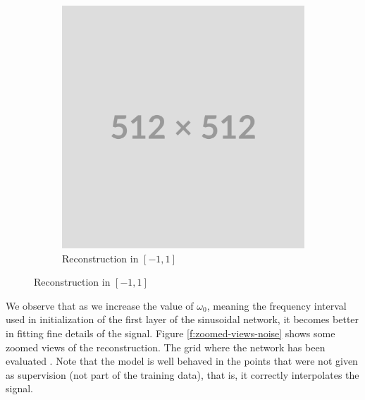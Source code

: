 \begin{figure}
    \begin{subfigure}[b]{0.6\textwidth}
        \centering
        \includegraphics[width=\textwidth]{img/placeholder512.png}
        \caption{Reconstruction in $[-1, 1]$}
        \label{fig:fft-smooth-noise1}
    \end{subfigure}

    \label{f:noise-smoothed-reconstruction}
\end{figure}

We observe that as we increase the value of $\omega_0$, meaning the frequency interval used in initialization of the first layer of the sinusoidal network, it becomes better in fitting fine details of the signal. Figure \ref{f:zoomed-views-noise} shows some zoomed views of the reconstruction. The grid where the network has been evaluated . Note that the model is well behaved in the points that were not given as supervision (not part of the training data), that is, it correctly interpolates the signal.

